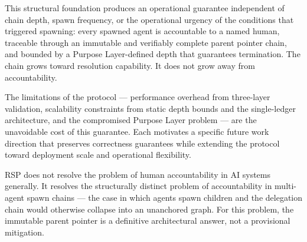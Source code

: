 This structural foundation produces an operational guarantee independent of chain depth, spawn frequency, or the operational urgency of the conditions that triggered spawning: every spawned agent is accountable to a named human, traceable through an immutable and verifiably complete parent pointer chain, and bounded by a Purpose Layer-defined depth that guarantees termination. The chain grows toward resolution capability. It does not grow away from accountability.

The limitations of the protocol — performance overhead from three-layer validation, scalability constraints from static depth bounds and the single-ledger architecture, and the compromised Purpose Layer problem — are the unavoidable cost of this guarantee. Each motivates a specific future work direction that preserves correctness guarantees while extending the protocol toward deployment scale and operational flexibility.

RSP does not resolve the problem of human accountability in AI systems generally. It resolves the structurally distinct problem of accountability in multi-agent spawn chains — the case in which agents spawn children and the delegation chain would otherwise collapse into an unanchored graph. For this problem, the immutable parent pointer is a definitive architectural answer, not a provisional mitigation.